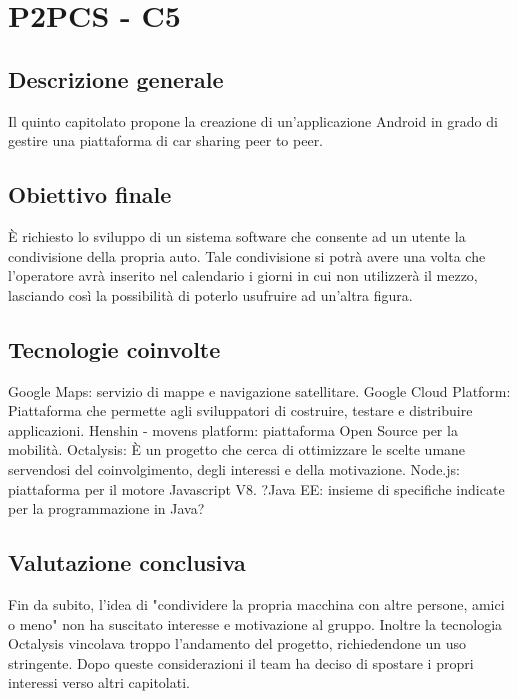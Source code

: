 \section{P2PCS - C5} \label{c5}
    \subsection{Descrizione generale}
    Il quinto capitolato propone la creazione di un'applicazione Android in grado di gestire una piattaforma di car sharing peer to peer.

    \subsection{Obiettivo finale}
    È richiesto lo sviluppo di un sistema software che consente ad un utente la condivisione della propria auto. Tale condivisione si potrà avere una volta che l'operatore avrà inserito nel calendario i giorni in cui non utilizzerà il mezzo, lasciando così la possibilità di poterlo usufruire ad un'altra figura.

    \subsection{Tecnologie coinvolte}
    Google Maps: servizio di mappe e navigazione satellitare.
	Google Cloud Platform: Piattaforma che permette agli sviluppatori di costruire, testare e distribuire applicazioni.
	Henshin - movens platform: piattaforma Open Source per la mobilità.
	Octalysis: È un progetto che cerca di ottimizzare le scelte umane servendosi del coinvolgimento, degli interessi e della motivazione.
	Node.js: piattaforma per il motore Javascript V8.
	?Java EE: insieme di specifiche indicate per la programmazione in Java?

    \subsection{Valutazione conclusiva}
    Fin da subito, l'idea di "condividere la propria macchina con altre persone, amici o meno" non ha suscitato interesse e motivazione al gruppo. Inoltre la tecnologia Octalysis vincolava troppo l'andamento del progetto, richiedendone un uso stringente. Dopo queste considerazioni il team ha deciso di spostare i propri interessi verso altri capitolati.
